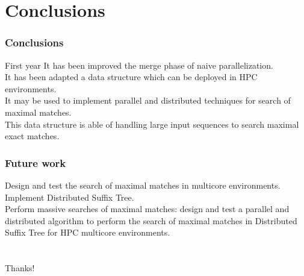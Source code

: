 \documentclass{beamer}
\begin{document}
\section{Conclusions}
    \begin{frame}
    \frametitle{Conclusions}
    \begin{block}{First year}
It has been improved the merge phase of naive parallelization.\\
It has been adapted a data structure which can be deployed in HPC environments.\\
It may be used to implement parallel and distributed techniques for search of maximal matches.\\
This data structure is able of handling large input sequences to search maximal exact matches.
\end{block}
\end{frame}
\begin{frame}
  \frametitle{Future work}
\begin{block}{}
Design and test the search of maximal matches in multicore environments.\\
Implement Distributed Suffix Tree.\\
Perform massive searches of maximal matches: design and test a parallel and distributed algorithm to perform the search of maximal matches in Distributed Suffix Tree for HPC multicore environments.
\end{block}
\end{frame}
\section{}
\begin{frame}
  \begin{center}
    \Huge{Thanks!}
\end{center}
\end{frame}
\begin{frame}
  \titlepage
\end{frame}
\end{document}
